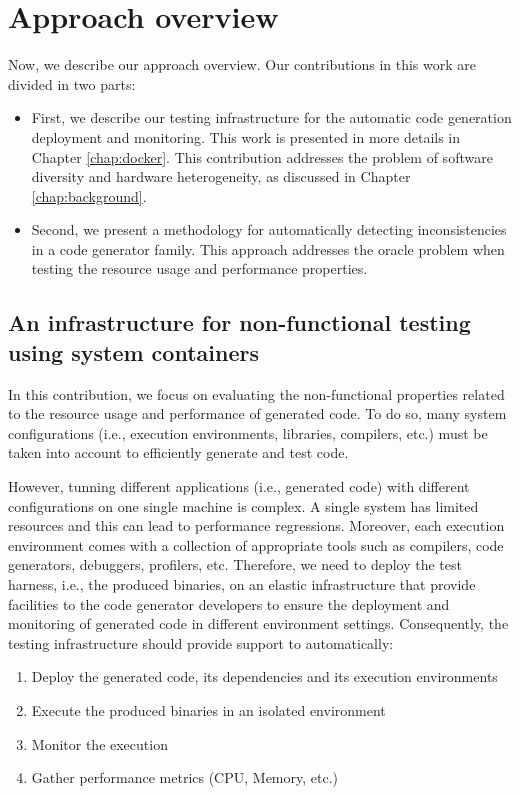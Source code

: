 \section{Approach overview}
\label{sec:cd_approach}
Now, we describe our approach overview. Our contributions in this work are divided in two parts:
\begin{itemize}
	\item First, we describe our testing infrastructure for the automatic code generation deployment and monitoring. This work is presented in more details in Chapter \ref{chap:docker}. This contribution addresses the problem of software diversity and hardware heterogeneity, as discussed in Chapter \ref{chap:background}.
	
	\item Second, we present a methodology for automatically detecting inconsistencies in a code generator family. This approach addresses the oracle problem when testing the resource usage and performance properties.
\end{itemize}


\subsection{An infrastructure for non-functional testing using system containers}
\label{sec:cg-An infrastructure for non-functional testing using system containers}
In this contribution, we focus on evaluating the non-functional properties related to the resource usage and performance of generated code. To do so, many system configurations (i.e., execution environments, libraries, compilers, etc.) must be taken into account to efficiently generate and test code. 

However, tunning different applications (i.e., generated code) with different configurations on one single machine is complex. A single system has limited resources and this can lead to performance regressions. Moreover, each execution environment comes with a collection of appropriate tools such as compilers, code generators, debuggers, profilers, etc. Therefore, we need to deploy the test harness, i.e., the produced binaries, on an elastic infrastructure that provide facilities to the code generator developers to ensure the deployment and monitoring of generated code in different environment settings. 
Consequently, the testing infrastructure should provide support to automatically:
\begin{enumerate}
	\item Deploy the generated code, its dependencies and its execution environments
	\item Execute the produced binaries in an isolated environment 
	\item Monitor the execution 
	\item Gather performance metrics (CPU, Memory, etc.)
\end{enumerate}

